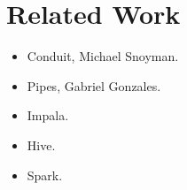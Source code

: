 \clearpage{}
\section{Related Work}

\begin{itemize}
\item Conduit, Michael Snoyman.
\item Pipes, Gabriel Gonzales.
\item Impala.
\item Hive.
\item Spark.
\end{itemize}
